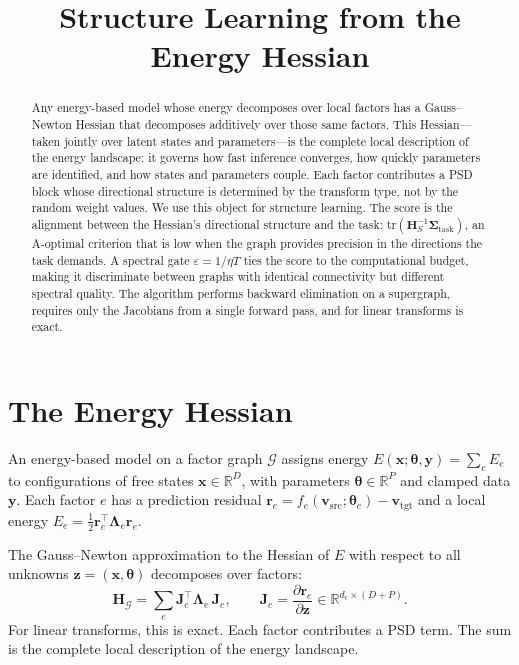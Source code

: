\documentclass[11pt, a4paper]{article}
\title{\bfseries Structure Learning from the Energy Hessian}
\author{}
\date{}
\newcommand{\R}{\mathbb{R}}
\newcommand{\bx}{\bm{x}}
\newcommand{\by}{\bm{y}}
\newcommand{\bz}{\bm{z}}
\newcommand{\btheta}{\bm{\theta}}
\newcommand{\cG}{\mathcal{G}}
\begin{document}
\maketitle
\thispagestyle{empty}

\begin{abstract}
Any energy-based model whose energy decomposes over local factors has a Gauss--Newton Hessian that decomposes additively over those same factors.
This Hessian---taken jointly over latent states and parameters---is the complete local description of the energy landscape: it governs how fast inference converges, how quickly parameters are identified, and how states and parameters couple.
Each factor contributes a PSD block whose directional structure is determined by the transform type, not by the random weight values.
We use this object for structure learning.
The score is the alignment between the Hessian's directional structure and the task: $\mathrm{tr}(\bm{H}_S^{-1}\bm{\Sigma}_{\mathrm{task}})$, an A-optimal criterion that is low when the graph provides precision in the directions the task demands.
A spectral gate $\varepsilon = 1/\eta T$ ties the score to the computational budget, making it discriminate between graphs with identical connectivity but different spectral quality.
The algorithm performs backward elimination on a supergraph, requires only the Jacobians from a single forward pass, and for linear transforms is exact.
\end{abstract}

\section{The Energy Hessian}

An energy-based model on a factor graph $\cG$ assigns energy $E(\bx;\btheta,\by) = \sum_e E_e$ to configurations of free states $\bx \in \R^D$, with parameters $\btheta \in \R^P$ and clamped data $\by$.
Each factor $e$ has a prediction residual $\bm{r}_e = f_e(\bm{v}_{\mathrm{src}};\btheta_e) - \bm{v}_{\mathrm{tgt}}$ and a local energy $E_e = \frac{1}{2}\bm{r}_e^\top\bm{\Lambda}_e\bm{r}_e$.

The Gauss--Newton approximation to the Hessian of $E$ with respect to all unknowns $\bz = (\bx, \btheta)$ decomposes over factors:
\begin{equation}\label{eq:joint}
    \bm{H}_\cG = \sum_e \bm{J}_e^\top \bm{\Lambda}_e\,\bm{J}_e, \qquad \bm{J}_e = \frac{\partial \bm{r}_e}{\partial \bz} \in \R^{d_e \times (D+P)}.
\end{equation}
For linear transforms, this is exact.
Each factor contributes a PSD term.
The sum is the complete local description of the energy landscape.
\end{document}
